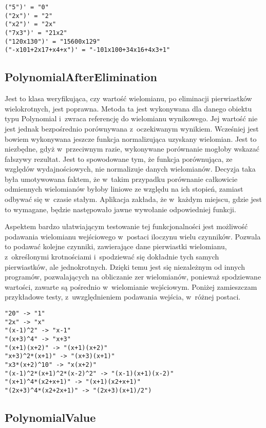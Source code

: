 \begin{lstlisting}
("5")' = "0"
("2x")' = "2"
("x2")' = "2x"
("7x3")' = "21x2"
("120x130")' = "15600x129"
("-x101+2x17+x4+x")' = "-101x100+34x16+4x3+1"
\end{lstlisting}

\subsection{PolynomialAfterElimination}

Jest to klasa weryfikująca, czy wartość wielomianu, po eliminacji pierwiastków wielokrotnych, jest poprawna. Metoda ta jest wykonywana dla danego obiektu typu Polynomial i~zwraca referencję do wielomianu wynikowego. Jej wartość nie jest jednak bezpośrednio porównywana z~oczekiwanym wynikiem. Wcześniej jest bowiem wykonywana jeszcze funkcja normalizująca uzyskany wielomian. Jest to niezbędne, gdyż w~przeciwnym razie, wykonywane porównanie mogłoby wskazać fałszywy rezultat. Jest to spowodowane tym, że funkcja porównująca, ze względów wydajnościowych, nie normalizuje danych wielomianów. Decyzja taka była umotywowana faktem, że w~takim przypadku porównanie całkowicie odmiennych wielomianów byłoby liniowe ze względu na ich stopień, zamiast odbywać się w~czasie stałym. Aplikacja zakłada, że w~każdym miejscu, gdzie jest to wymagane, będzie następowało jawne wywołanie odpowiedniej funkcji.

Aspektem bardzo ułatwiającym testowanie tej funkcjonalności jest możliwość podawania wielomianu wejściowego w~postaci iloczynu wielu czynników. Pozwala to podawać kolejne czynniki, zawierające dane pierwiastki wielomianu, z~określonymi krotnościami i~spodziewać się dokładnie tych samych pierwiastków, ale jednokrotnych. Dzięki temu jest się niezależnym od innych programów, pozwalających na obliczanie zer wielomianów, ponieważ spodziewane wartości, zawarte są pośrednio w~wielomianie wejściowym. Poniżej zamieszczam przykładowe testy, z~uwzględnieniem podawania wejścia, w~różnej postaci.

\begin{lstlisting}
"20" -> "1"
"2x" -> "x"
"(x-1)^2" -> "x-1"
"(x+3)^4" -> "x+3"
"(x+1)(x+2)" -> "(x+1)(x+2)"
"x+3)^2*(x+1)" -> "(x+3)(x+1)"
"x3*(x+2)^10" -> "x(x+2)"
"(x-1)^2*(x+1)^2*(x-2)^2" -> "(x-1)(x+1)(x-2)"
"(x+1)^4*(x2+x+1)" -> "(x+1)(x2+x+1)"
"(2x+3)^4*(x2+2x+1)" -> "(2x+3)(x+1)/2")
\end{lstlisting}

\subsection{PolynomialValue}

